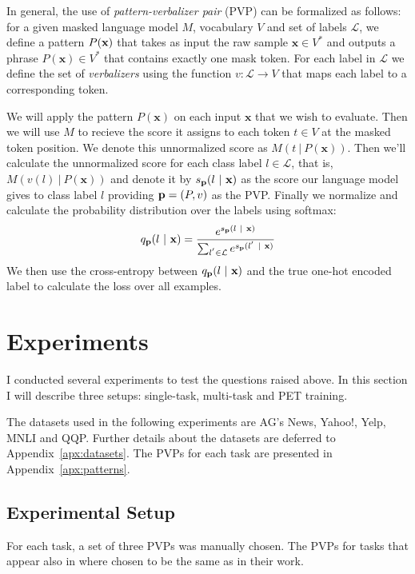 \documentclass[11pt,a4paper]{article}
\begin{document}
In general, the use of \textit{pattern-verbalizer pair} (PVP) can be formalized as follows: for a given masked language model $M$, vocabulary $V$ and set of labels $\mathcal{L}$, we define a pattern $P(\textbf{\text{x}})$ that takes as input the raw sample $\textbf{x}\in{}V^*$ and outputs a phrase $P(\textbf{x})\in{}V^*$ that contains exactly one mask token.
For each label in $\mathcal{L}$ we define the set of \textit{verbalizers} using the function $v:\mathcal{L}\rightarrow{}V$ that maps each label to a corresponding token.

We will apply the pattern $P(\textbf{x})$ on each input $\textbf{x}$ that we wish to evaluate.
Then we will use $M$ to recieve the score it assigns to each token $t\in{}V$ at the masked token position.
We denote this unnormalized score as $M(t\ |\ P(\textbf{x}))$.
Then we'll calculate the unnormalized score for each class label $l\in{}\mathcal{L}$, that is, $M(v(l)\ |\ P(\textbf{x}))$ and denote it by $s_{\text{\textbf{p}}}(l\ |\ \textbf{x})$ as the score our language model gives to class label $l$ providing $\text{\textbf{p}}=(P, v)$ as the PVP.
Finally we normalize and calculate the probability distribution over the labels using softmax:
\[
	q_\text{\textbf{p}}(l\ |\ \textbf{x}) = \frac{e^{s_{\text{\textbf{p}}}(l\ |\ \textbf{x})}}{\sum_{l^{'}\in{}\mathcal{L}}e^{s_{\text{\textbf{p}}}(l^{'}\ |\ \textbf{x})}}
\]
We then use the cross-entropy between $q_\text{\textbf{p}}(l\ |\ \textbf{x})$ and the true one-hot encoded label to calculate the loss over all examples. 

\section{Experiments}
\label{sec:experiments}




I conducted several experiments to test the questions raised above.
In this section I will describe three setups: single-task, multi-task and PET training.

The datasets used in the following experiments are AG's News, Yahoo!, Yelp, MNLI and QQP.
Further details about the datasets are deferred to Appendix~\ref{apx:datasets}.
The PVPs for each task are presented in Appendix~\ref{apx:patterns}.

\subsection{Experimental Setup}
\label{sub-sec:experimental-setup}
For each task, a set of three PVPs was manually chosen.
The PVPs for tasks that appear also in \citet{schick2020exploiting} where chosen to be the same as in their work.
\end{document}
